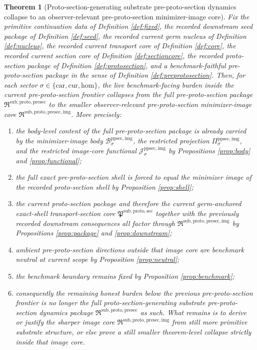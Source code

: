 \documentclass[11pt]{article}
\newcommand{\Car}{\mathrm{car}}
\newcommand{\Cur}{\mathrm{cur}}
\newcommand{\Hom}{\mathrm{hom}}
\newcommand{\ProtoSectionCore}{\mathfrak P^{\mathrm{sub,proto,sec}}}
\newcommand{\PreProtoSectionPackage}{\mathfrak R^{\mathrm{sub,proto,presec}}}
\newcommand{\PreProtoSectionImageCore}{\mathfrak R^{\mathrm{sub,proto,presec,img}}}
\newcommand{\PreProtoSectionImgBody}[1]{\mathcal B_{#1}^{\mathrm{ppsec,img}}}
\newcommand{\PreProtoSectionImgProj}[1]{\Pi_{#1}^{\mathrm{ppsec,img}}}
\newcommand{\PreProtoSectionImgFunctional}[1]{\mathscr J_{#1}^{\mathrm{ppsec,img}}}
\newtheorem{theorem}{Theorem}
\begin{document}
\begin{theorem}[Proto-section-generating substrate pre-proto-section dynamics collapse to an observer-relevant pre-proto-section minimizer-image core]
\label{thm:main}
Fix the primitive continuation data of Definition \ref{def:fixed}, the recorded downstream seed package of Definition \ref{def:seed}, the recorded current germ nucleus of Definition \ref{def:nucleus}, the recorded current transport core of Definition \ref{def:core}, the recorded current section core of Definition \ref{def:sectioncore}, the recorded proto-section package of Definition \ref{def:protosection}, and a benchmark-faithful pre-proto-section package in the sense of Definition \ref{def:preprotosection}. Then, for each sector \(\sigma\in\{\Car,\Cur,\Hom\}\), the live benchmark-facing burden inside the current pre-proto-section frontier collapses from the full pre-proto-section package \(\PreProtoSectionPackage\) to the smaller observer-relevant pre-proto-section minimizer-image core \(\PreProtoSectionImageCore\). More precisely:
\begin{enumerate}
    \item the body-level content of the full pre-proto-section package is already carried by the minimizer-image body \(\PreProtoSectionImgBody{\sigma}\), the restricted projection \(\PreProtoSectionImgProj{\sigma}\), and the restricted image-core functional \(\PreProtoSectionImgFunctional{\sigma}\) by Propositions \ref{prop:body} and \ref{prop:functional};
    \item the full exact pre-proto-section shell is forced to equal the minimizer image of the recorded proto-section shell by Proposition \ref{prop:shell};
    \item the current proto-section package and therefore the current germ-anchored exact-shell transport-section core \(\ProtoSectionCore\) together with the previously recorded downstream consequences all factor through \(\PreProtoSectionImageCore\) by Propositions \ref{prop:package} and \ref{prop:downstream};
    \item ambient pre-proto-section directions outside that image core are benchmark neutral at current scope by Proposition \ref{prop:neutral};
    \item the benchmark boundary remains fixed by Proposition \ref{prop:benchmark};
    \item consequently the remaining honest burden below the previous pre-proto-section frontier is no longer the full proto-section-generating substrate pre-proto-section dynamics package \(\PreProtoSectionPackage\) as such. What remains is to derive or justify the sharper image core \(\PreProtoSectionImageCore\) from still more primitive substrate structure, or else prove a still smaller theorem-level collapse strictly inside that image core.
\end{enumerate}
\end{theorem}
\end{document}
